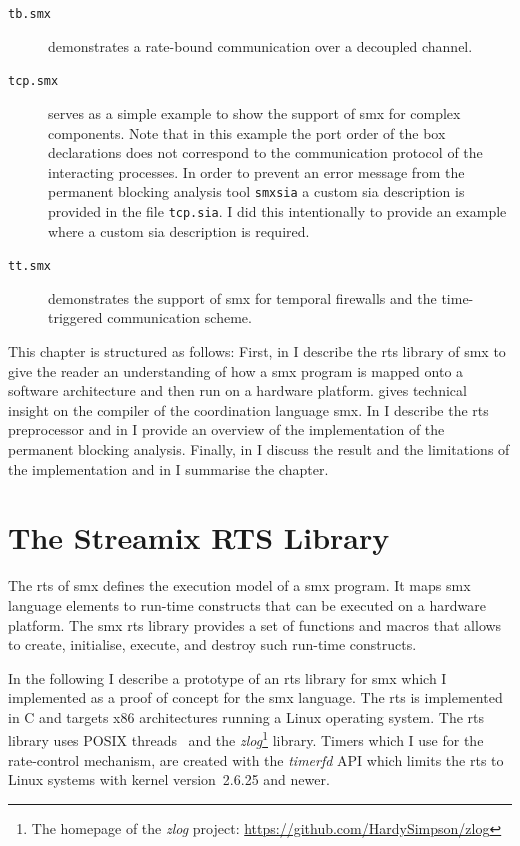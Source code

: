 \begin{description}
    \item[\texttt{tb.smx}] demonstrates a rate-bound communication over a decoupled channel.
    \item[\texttt{tcp.smx}] serves as a simple example to show the support of \gls*{smx} for complex components.
        Note that in this example the port order of the box declarations does not correspond to the communication protocol of the interacting processes.
        In order to prevent an error message from the permanent blocking analysis tool \texttt{smxsia} a custom \gls{sia} description is provided in the file \texttt{tcp.sia}.
        I did this intentionally to provide an example where a custom \gls{sia} description is required.
    \item[\texttt{tt.smx}] demonstrates the support of \gls*{smx} for temporal firewalls and the time-triggered communication scheme.
\end{description}

This chapter is structured as follows:
First, in \Sect{\ref{sect_tool_rts}} I describe the \gls{rts} library of \gls*{smx} to give the reader an understanding of how a \gls*{smx} program is mapped onto a software architecture and then run on a hardware platform.
\Sect{\ref{sect_tool_smxc}} gives technical insight on the compiler of the coordination language \gls*{smx}.
In \Sect{\ref{sect_tool_smxrtsp}} I describe the \gls{rts} preprocessor and in \Sect{\ref{sect_tool_smxsia}} I provide an overview of the implementation of the permanent blocking analysis.
Finally, in \Sect{\ref{sect_tool_discussion}} I discuss the result and the limitations of the implementation and in \Sect{\ref{sect_tool_summary}} I summarise the chapter.

\section{The Streamix RTS Library}
\label{sect_tool_rts}
The \gls{rts} of \gls*{smx} defines the execution model of a \gls*{smx} program.
It maps \gls*{smx} language elements to run-time constructs that can be executed on a hardware platform.
The \gls*{smx} \gls{rts} library provides a set of functions and macros that allows to create, initialise, execute, and destroy such run-time constructs.

In the following I describe a prototype of an \gls{rts} library for \gls*{smx} which I implemented as a proof of concept for the \gls*{smx} language.
The \gls{rts} is implemented in C and targets x86 architectures running a Linux operating system.
The \gls{rts} library uses POSIX threads~\cite{posix2009} and the \emph{zlog}\footnote{The homepage of the \emph{zlog} project: \url{https://github.com/HardySimpson/zlog}} library.
Timers which I use for the rate-control mechanism, are created with the \emph{timerfd} API which limits the \gls{rts} to Linux systems with kernel version~2.6.25 and newer.

